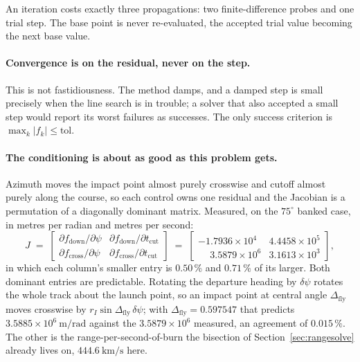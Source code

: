 \documentclass[11pt]{article}
\begin{document}
An iteration costs exactly three propagations: two finite-difference probes and
one trial step. The base point is never re-evaluated, the accepted trial value
becoming the next base value.

\paragraph{Convergence is on the residual, never on the step.} This is not
fastidiousness. The method damps, and a damped step is small precisely when the
line search is in trouble; a solver that also accepted a small step would
report its worst failures as successes. The only success criterion is
$\max_k|f_k| \le \text{tol}$.

\paragraph{The conditioning is about as good as this problem gets.} Azimuth
moves the impact point almost purely crosswise and cutoff almost purely along
the course, so each control owns one residual and the Jacobian is a
permutation of a diagonally dominant matrix. Measured, on the $75^{\circ}$
banked case, in metres per radian and metres per second:
\begin{equation}
  J \;=\;
  \begin{bmatrix}
    \partial f_{\text{down}}/\partial\psi &
    \partial f_{\text{down}}/\partial t_{\text{cut}} \\[2pt]
    \partial f_{\text{cross}}/\partial\psi &
    \partial f_{\text{cross}}/\partial t_{\text{cut}}
  \end{bmatrix}
  \;=\;
  \begin{bmatrix}
    -1.7936\times10^{4} & 4.4458\times10^{5} \\
    \phantom{-}3.5879\times10^{6} & 3.1613\times10^{3}
  \end{bmatrix},
  \label{eq:jacmeas}
\end{equation}
in which each column's smaller entry is $0.50\,\%$ and $0.71\,\%$ of its
larger.
Both dominant entries are predictable. Rotating the departure heading by
$\delta\psi$ rotates the whole track about the launch point, so an impact point
at central angle $\Delta_{\text{fly}}$ moves crosswise by
$r_I\sin\Delta_{\text{fly}}\,\delta\psi$; with $\Delta_{\text{fly}} = 0.597547$
that predicts $3.5885\times10^{6}~\mathrm{m/rad}$ against the
$3.5879\times10^{6}$ measured, an agreement of $0.015\,\%$. The other is the
range-per-second-of-burn the bisection of Section~\ref{sec:rangesolve} already
lives on, $444.6~\mathrm{km/s}$ here.
\end{document}
